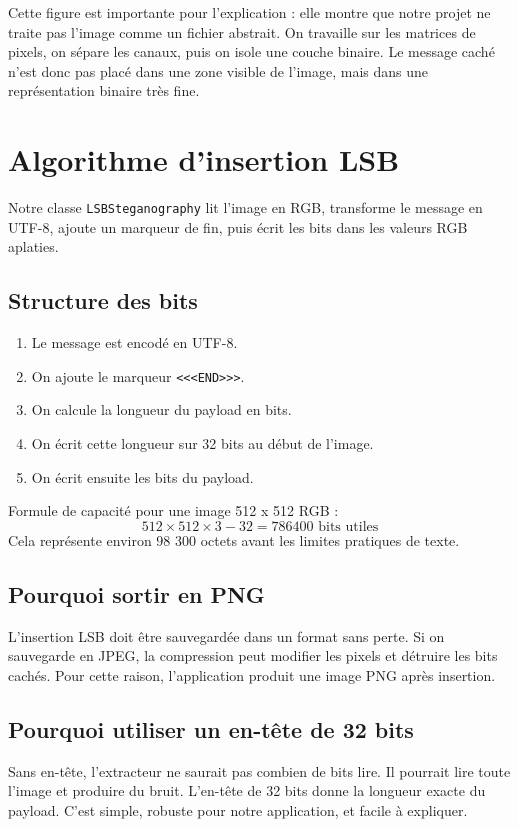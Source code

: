 \documentclass[11pt,a4paper]{article}
\begin{document}
Cette figure est importante pour l'explication : elle montre que notre projet ne traite pas l'image comme un fichier abstrait. On travaille sur les matrices de pixels, on sépare les canaux, puis on isole une couche binaire. Le message caché n'est donc pas placé dans une zone visible de l'image, mais dans une représentation binaire très fine.

\section{Algorithme d'insertion LSB}
Notre classe \texttt{LSBSteganography} lit l'image en RGB, transforme le message en UTF-8, ajoute un marqueur de fin, puis écrit les bits dans les valeurs RGB aplaties.

\subsection{Structure des bits}
\begin{enumerate}
  \item Le message est encodé en UTF-8.
  \item On ajoute le marqueur \texttt{<<<END>>>}.
  \item On calcule la longueur du payload en bits.
  \item On écrit cette longueur sur 32 bits au début de l'image.
  \item On écrit ensuite les bits du payload.
\end{enumerate}

Formule de capacité pour une image 512 x 512 RGB :
\[
512 \times 512 \times 3 - 32 = 786400 \text{ bits utiles}
\]
Cela représente environ 98 300 octets avant les limites pratiques de texte.

\subsection{Pourquoi sortir en PNG}
L'insertion LSB doit être sauvegardée dans un format sans perte. Si on sauvegarde en JPEG, la compression peut modifier les pixels et détruire les bits cachés. Pour cette raison, l'application produit une image PNG après insertion.

\subsection*{Pourquoi utiliser un en-tête de 32 bits}
Sans en-tête, l'extracteur ne saurait pas combien de bits lire. Il pourrait lire toute l'image et produire du bruit. L'en-tête de 32 bits donne la longueur exacte du payload. C'est simple, robuste pour notre application, et facile à expliquer.
\end{document}
